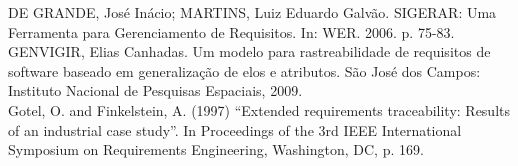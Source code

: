 DE GRANDE, José Inácio; MARTINS, Luiz Eduardo Galvão. SIGERAR: Uma Ferramenta para Gerenciamento de Requisitos. In: WER. 2006. p. 75-83.\\

GENVIGIR, Elias Canhadas. Um modelo para rastreabilidade de requisitos de software baseado em generalização de elos e atributos. São José dos Campos: Instituto Nacional de Pesquisas Espaciais, 2009.\\

Gotel, O. and Finkelstein, A. (1997) “Extended requirements traceability: Results of an industrial case study”. In Proceedings of the 3rd IEEE International Symposium on Requirements Engineering, Washington, DC, p. 169.\\
